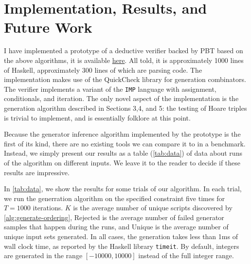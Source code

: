 \documentclass[10pt,a4paper]{article}
\begin{document}
\section{Implementation, Results, and Future Work}
\label{sec:impl}

I have implemented a prototype of a deductive verifier backed by PBT based on the above algorithms, it is available \href{https://github.com/jdublu10/triple-testing}{here}. All told, it is approximately 1000 lines of Haskell, approximately 300 lines of which are parsing code. The implementation makes use of the QuickCheck library \cite{} for generation combinators. The verifier implements a variant of the \texttt{IMP} language \cite{}
with assignment, conditionals, and iteration. The only novel aspect of the implementation is the generation algorithm described in Sections 3,4, and 5: the testing of Hoare triples is trivial to implement, and is essentially folklore at this point.

Because the generator inference algorithm implemented by the prototype is the first of its kind, there are no existing tools we can compare it to in a benchmark. Instead, we simply present our results as a table (\autoref{tab:data}) of data about runs of the algorithm on different inputs. We leave it to the reader to decide if these results are impressive.

In \autoref{tab:data}, we show the results for some trials of our algorithm. In each trial, we run the generration algorithm on the specified constraint five times for $T = 1000$ iterations. $K$ is the average number of unique scripts discovered by \autoref{alg:generate-ordering}, Rejected is the average number of failed generator samples that happen during the runs, and Unique is the average number of unique input sets generated. In all cases, the generation takes less than 1ms of wall clock time, as reported by the Haskell library \texttt{timeit}. By default, integers are generated in the range $[-10000,10000]$ instead of the full integer range.
\end{document}
